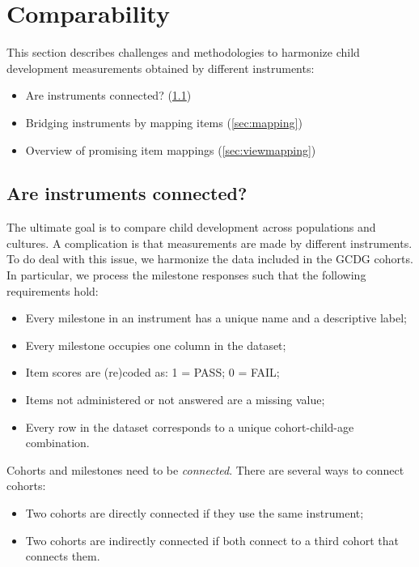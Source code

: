 \documentclass[
]{book}
\providecommand{\tightlist}{%
  \setlength{\itemsep}{0pt}\setlength{\parskip}{0pt}}
\begin{document}
\newpage

\hypertarget{ch:comparability}{%
\chapter{Comparability}\label{ch:comparability}}

This section describes challenges and methodologies to harmonize child development measurements obtained by different instruments:

\begin{itemize}
\tightlist
\item
  Are instruments connected? (\ref{sec:challenge})
\item
  Bridging instruments by mapping items (\ref{sec:mapping})
\item
  Overview of promising item mappings (\ref{sec:viewmapping})
\end{itemize}

\hypertarget{sec:challenge}{%
\section{Are instruments connected?}\label{sec:challenge}}

The ultimate goal is to compare child development across populations and cultures. A complication is that measurements are made by different instruments. To do deal with this issue, we harmonize the data included in the GCDG cohorts. In particular, we process the milestone responses such that the following requirements hold:

\begin{itemize}
\tightlist
\item
  Every milestone in an instrument has a unique name and a descriptive label;
\item
  Every milestone occupies one column in the dataset;
\item
  Item scores are (re)coded as: 1 = PASS; 0 = FAIL;
\item
  Items not administered or not answered are a missing value;
\item
  Every row in the dataset corresponds to a unique cohort-child-age combination.
\end{itemize}

Cohorts and milestones need to be \emph{connected}. There are several ways to connect cohorts:

\begin{itemize}
\tightlist
\item
  Two cohorts are directly connected if they use the same instrument;
\item
  Two cohorts are indirectly connected if both connect to a third cohort that connects them.
\end{itemize}
\end{document}
